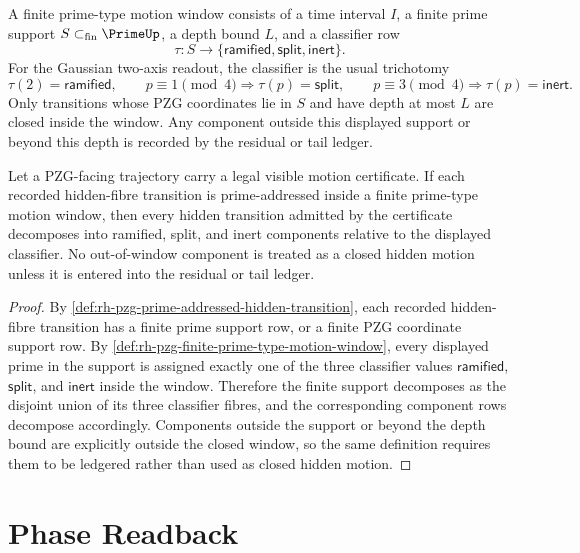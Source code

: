 \begin{definition}
\label{def:rh-pzg-finite-prime-type-motion-window}
A finite prime-type motion window consists of a time interval $I$, a finite
prime support $S\subset_{\mathrm{fin}}\PrimeUp$, a depth bound $L$, and a
classifier row
$$
\tau:S\to
\{\mathsf{ramified},\mathsf{split},\mathsf{inert}\}.
$$
For the Gaussian two-axis readout, the classifier is the usual trichotomy
$$
\tau(2)=\mathsf{ramified},
\qquad
p\equiv 1\pmod 4\Rightarrow\tau(p)=\mathsf{split},
\qquad
p\equiv 3\pmod 4\Rightarrow\tau(p)=\mathsf{inert}.
$$
Only transitions whose PZG coordinates lie in $S$ and have depth at most
$L$ are closed inside the window.  Any component outside this displayed
support or beyond this depth is recorded by the residual or tail ledger.
\end{definition}

\begin{theorem}
\label{thm:rh-pzg-prime-addressed-motion-locally-classified}
Let a PZG-facing trajectory carry a legal visible motion certificate.  If
each recorded hidden-fibre transition is prime-addressed inside a finite
prime-type motion window, then every hidden transition admitted by the
certificate decomposes into ramified, split, and inert components relative
to the displayed classifier.  No out-of-window component is treated as a
closed hidden motion unless it is entered into the residual or tail ledger.
\end{theorem}

\begin{proof}
By \autoref{def:rh-pzg-prime-addressed-hidden-transition}, each recorded
hidden-fibre transition has a finite prime support row, or a finite PZG
coordinate support row.  By
\autoref{def:rh-pzg-finite-prime-type-motion-window}, every displayed prime
in the support is assigned exactly one of the three classifier values
$\mathsf{ramified}$, $\mathsf{split}$, and $\mathsf{inert}$ inside the
window.  Therefore the finite support decomposes as the disjoint union of
its three classifier fibres, and the corresponding component rows decompose
accordingly.  Components outside the support or beyond the depth bound are
explicitly outside the closed window, so the same definition requires them
to be ledgered rather than used as closed hidden motion.
\end{proof}

\section{Phase Readback}
\label{sec:rh-pzg-phase-readback}

